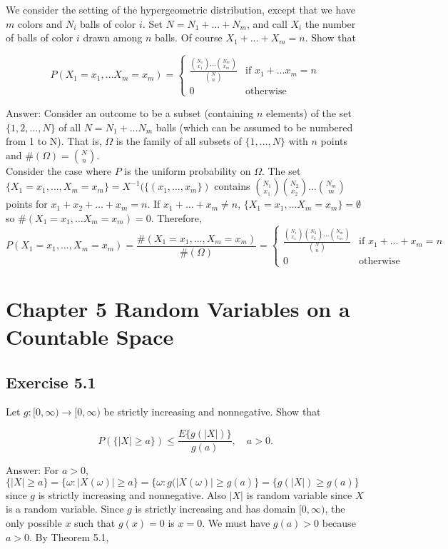 \documentclass{article}
\begin{document}
We consider the setting of the hypergeometric distribution, except that we have $m$ colors and $N_i$ balls of color $i$. Set $N = N_1+\dots +N_m$, and call $X_i$ the
number of balls of color $i$ drawn among $n$ balls. Of course $X_1 + \dots +X_m = n$.
Show that

$$
P(X_1 = x_1, \dots X_m = x_m) = 
\begin{cases}
\frac{\binom{N_1}{x_1} \dots \binom{N_m}{x_m}}{\binom{N}{n}} & \text{if } x_1 + \dots x_m = n \\
0 & \text{otherwise}
\end{cases}
$$

Answer: Consider an outcome to be a subset (containing $n$ elements) of the set $\{1,2, \dots, N\}$ of all $N = N_1+\dots N_m$ balls (which can be assumed to be numbered from 1 to N). That is, $\Omega$ is the family of all subsets of $\{1,\dots, N\}$ with $n$ points and $\#(\Omega) = \binom{N}{n}$. \\

Consider the case where $P$ is the uniform probability on $\Omega$. The set $\{X_1 = x_1, \dots , X_m = x_m\} = X^{-1}(\{(x_1, \dots , x_m\})$ contains $\binom{N_1}{x_1}\binom{N_2}{x_2} \dots \binom{N_m}{m}$ points for $x_1 + x_2 + \dots + x_m = n$. If $x_1 + \dots + x_m \neq n$, $ \{X_1 = x_1, \dots X_m = x_m\} = \emptyset$ so $\#(X_1 = x_1, \dots X_m = x_m) = 0$. Therefore,
$$
P(X_1 = x_1, \dots , X_m = x_m) = \frac{\#(X_1 = x_1, \dots , X_m = x_m)}{\#(\Omega)} 
=
\begin{cases}
\frac{\binom{N_1}{x_1} \binom{N_2}{x_2}\dots \binom{N_m}{x_m}}{\binom{N}{n}} & \text{if } x_1 + \dots + x_m = n \\
0 & \text{otherwise}
\end{cases}
$$

\section*{Chapter 5 Random Variables on a Countable Space}

\subsection*{Exercise 5.1}

Let $g : [0, \infty) \rightarrow [0,\infty)$ be strictly increasing and nonnegative. Show that

$$
P(\{|X| \geq a\}) \leq
\frac{E\{g(|X|)\}}
{g(a)}, \quad a > 0.
$$

Answer: For $a > 0$, $\{|X| \geq a \} = \{\omega : |X(\omega)| \geq a\} = \{\omega : g(|X(\omega)| \geq g(a)\} = \{g(|X|) \geq g(a)\}$ since $g$ is strictly increasing and nonnegative. Also $|X|$ is random variable since $X$ is a random variable. Since $g$ is strictly increasing and has domain $[0,\infty)$, the only possible $x$ such that $g(x) = 0$ is $x = 0$. We must have $g(a) > 0$ because $a > 0$. By Theorem 5.1,
\end{document}
